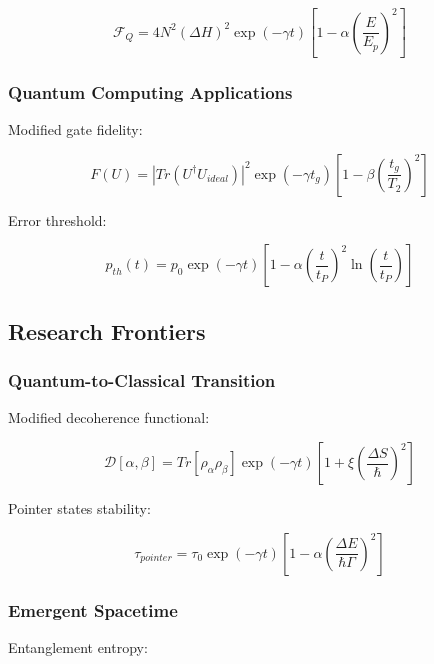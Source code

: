 \documentclass[12pt]{article}
\theoremstyle{plain}
\theoremstyle{definition}
\theoremstyle{remark}
\begin{document}
\begin{equation}
\mathcal{F}_Q = 4N^2(\Delta H)^2\exp(-\gamma t)\left[1 - \alpha\left(\frac{E}{E_p}\right)^2\right]
\end{equation}

\subsubsection{Quantum Computing Applications}

Modified gate fidelity:

\begin{equation}
F(U) = |Tr(U^\dagger U_{ideal})|^2\exp(-\gamma t_g)\left[1 - \beta\left(\frac{t_g}{T_2}\right)^2\right]
\end{equation}

Error threshold:

\begin{equation}
p_{th}(t) = p_0\exp(-\gamma t)\left[1 - \alpha\left(\frac{t}{t_P}\right)^2\ln\left(\frac{t}{t_P}\right)\right]
\end{equation}

\subsection{Research Frontiers}

\subsubsection{Quantum-to-Classical Transition}

Modified decoherence functional:

\begin{equation}
\mathcal{D}[\alpha,\beta] = Tr[\rho_\alpha\rho_\beta]\exp(-\gamma t)\left[1 + \xi\left(\frac{\Delta S}{\hbar}\right)^2\right]
\end{equation}

Pointer states stability:

\begin{equation}
\tau_{pointer} = \tau_0\exp(-\gamma t)\left[1 - \alpha\left(\frac{\Delta E}{\hbar\Gamma}\right)^2\right]
\end{equation}

\subsubsection{Emergent Spacetime}

Entanglement entropy:
\end{document}
